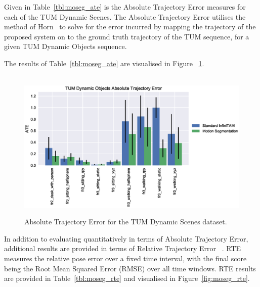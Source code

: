Given in Table~\ref{tbl:moseg_ate} is the Absolute Trajectory Error measures
for each of the TUM Dynamic Scenes. The Absolute Trajectory Error utilises the
method of Horn~\cite{Horn1987} to solve for the error incurred by mapping the
trajectory of the proposed system on to the ground truth trajectory of the TUM
sequence, for a given TUM Dynamic Objects sequence.

The results of Table~\ref{tbl:moseg_ate} are visualised in Figure
~\ref{fig:moseg_ate}.

\begin{figure}[!htbp]
~\label{fig:moseg_ate}
  \centering
  \includegraphics[width=0.95\linewidth]{figures/moseg/ate.eps}
  \caption[Motion Segmentation ATE]
  {Absolute Trajectory Error for the TUM Dynamic Scenes dataset.}
\end{figure}

In addition to evaluating quantitatively in terms of Absolute Trajectory Error,
additional results are provided in terms of Relative Trajectory Error
~\cite{Sturm2012}. RTE measures the relative pose error over a fixed time
interval, with the final score being the Root Mean Squared Error (RMSE) over all 
time windows. RTE results are provided in Table~\ref{tbl:moseg_rte} and visualised 
in Figure~\ref{fig:moseg_rte}.

